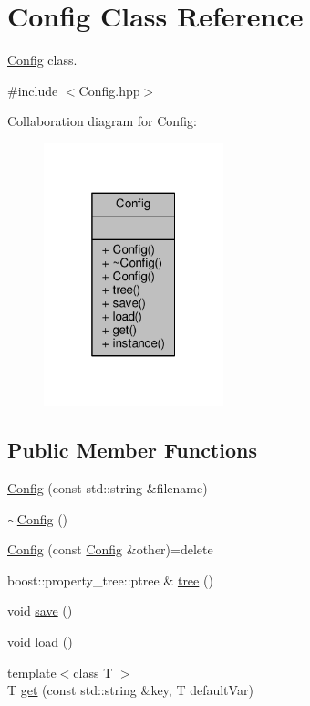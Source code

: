 \hypertarget{class_config}{\section{Config Class Reference}
\label{class_config}
}


\hyperlink{class_config}{Config} class.  




{\ttfamily \#include $<$Config.\-hpp$>$}



Collaboration diagram for Config\-:
\nopagebreak
\begin{figure}[H]
\begin{center}
\leavevmode
\includegraphics[width=148pt]{class_config__coll__graph}
\end{center}
\end{figure}
\subsection*{Public Member Functions}
\begin{DoxyCompactItemize}
\item 
\hyperlink{class_config_abc51a2c710c8666d27b53cc03597201d}{Config} (const std\-::string \&filename)
\item 
\hyperlink{class_config_a543dce59b66475c5108088ee4ce1cdfc}{$\sim$\-Config} ()
\item 
\hyperlink{class_config_aea1b7e862074892ee39a5583c342c482}{Config} (const \hyperlink{class_config}{Config} \&other)=delete
\item 
boost\-::property\-\_\-tree\-::ptree \& \hyperlink{class_config_a006701bd126aa5809b3a15e75c63bfb6}{tree} ()
\item 
void \hyperlink{class_config_ae7e68962f22a2c965a61702de1c637db}{save} ()
\item 
void \hyperlink{class_config_add4ebd0c89505c9b5368f03264555606}{load} ()
\item 
{\footnotesize template$<$class T $>$ }\\T \hyperlink{class_config_a1f8e429f853f20cac7cf128f2b71543e}{get} (const std\-::string \&key, T default\-Var)
\end{DoxyCompactItemize}
